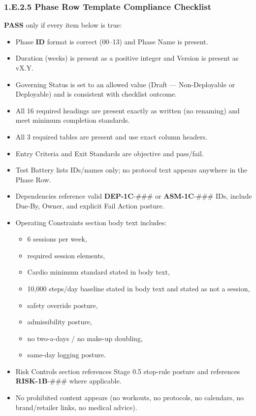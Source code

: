 \documentclass[10pt]{article}
\begin{document}
\newpage
\subsubsection*{1.E.2.5 Phase Row Template Compliance Checklist}

\textbf{PASS} only if every item below is true:

\begin{itemize}
\item Phase \textbf{ID} format is correct (00–13) and Phase Name is present.
\item Duration (weeks) is present as a positive integer and Version is present as vX.Y.
\item Governing Status is set to an allowed value (Draft — Non-Deployable or Deployable) and is consistent with checklist outcome.
\item All 16 required headings are present exactly as written (no renaming) and meet minimum completion standards.
\item All 3 required tables are present and use exact column headers.
\item Entry Criteria and Exit Standards are objective and pass/fail.
\item Test Battery lists IDs/names only; no protocol text appears anywhere in the Phase Row.
\item Dependencies reference valid \textbf{DEP-1C}-\#\#\# or \textbf{ASM-1C}-\#\#\# IDs, include Due-By, Owner, and explicit Fail Action posture.
\item Operating Constraints section body text includes:
  \begin{itemize}
  \item 6 sessions per week,
  \item required session elements,
  \item Cardio minimum standard stated in body text,
  \item 10,000 steps/day baseline stated in body text and stated as not a session,
  \item safety override posture,
  \item admissibility posture,
  \item no two-a-days / no make-up doubling,
  \item same-day logging posture.
  \end{itemize}
\item Risk Controls section references Stage 0.5 stop-rule posture and references \textbf{RISK-1B}-\#\#\# where applicable.
\item No prohibited content appears (no workouts, no protocols, no calendars, no brand/retailer links, no medical advice).
\end{itemize}
\end{document}
